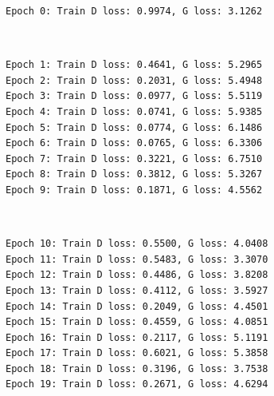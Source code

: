 \documentclass[11pt]{article}
\begin{document}
    \begin{Verbatim}[commandchars=\\\{\}]
Epoch 0: Train D loss: 0.9974, G loss: 3.1262

    \end{Verbatim}

    \begin{center}
    \end{center}
    { \hspace*{\fill} \\}
    
    \begin{Verbatim}[commandchars=\\\{\}]
Epoch 1: Train D loss: 0.4641, G loss: 5.2965
Epoch 2: Train D loss: 0.2031, G loss: 5.4948
Epoch 3: Train D loss: 0.0977, G loss: 5.5119
Epoch 4: Train D loss: 0.0741, G loss: 5.9385
Epoch 5: Train D loss: 0.0774, G loss: 6.1486
Epoch 6: Train D loss: 0.0765, G loss: 6.3306
Epoch 7: Train D loss: 0.3221, G loss: 6.7510
Epoch 8: Train D loss: 0.3812, G loss: 5.3267
Epoch 9: Train D loss: 0.1871, G loss: 4.5562

    \end{Verbatim}

    \begin{center}
    \end{center}
    { \hspace*{\fill} \\}
    
    \begin{Verbatim}[commandchars=\\\{\}]
Epoch 10: Train D loss: 0.5500, G loss: 4.0408
Epoch 11: Train D loss: 0.5483, G loss: 3.3070
Epoch 12: Train D loss: 0.4486, G loss: 3.8208
Epoch 13: Train D loss: 0.4112, G loss: 3.5927
Epoch 14: Train D loss: 0.2049, G loss: 4.4501
Epoch 15: Train D loss: 0.4559, G loss: 4.0851
Epoch 16: Train D loss: 0.2117, G loss: 5.1191
Epoch 17: Train D loss: 0.6021, G loss: 5.3858
Epoch 18: Train D loss: 0.3196, G loss: 3.7538
Epoch 19: Train D loss: 0.2671, G loss: 4.6294

    \end{Verbatim}

    \begin{center}
    \end{center}
    { \hspace*{\fill} \\}
    
\end{document}
